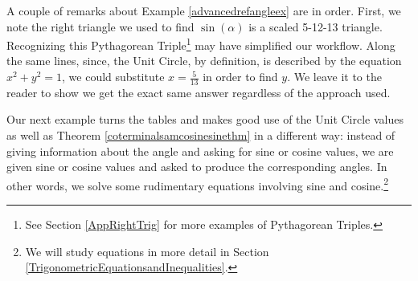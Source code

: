 \documentclass{ximera}
\begin{document}
 A couple of remarks about Example \ref{advancedrefangleex} are in order.  First, we note the right triangle we used to find $\sin(\alpha)$ is a scaled 5-12-13 triangle.  Recognizing this Pythagorean Triple\footnote{See Section \ref{AppRightTrig} for more examples of Pythagorean Triples.}  may have simplified our workflow.  Along the same lines, since, the Unit Circle, by definition, is described by the equation $x^2+y^2 = 1$,  we could substitute $x = \frac{5}{13}$ in order to find $y$.   We leave it to the reader to show we get the exact same answer regardless of the approach used.


Our next example turns the tables and makes good use of the Unit Circle values as well as Theorem \ref{coterminalsamcosinesinethm} in a different way:  instead of giving information about the angle and asking for sine or cosine values, we are given sine or cosine values and asked to produce the corresponding angles.  In other words, we solve some rudimentary equations involving sine and cosine.\footnote{We will study equations in more detail in Section \ref{TrigonometricEquationsandInequalities}.}
\end{document}
